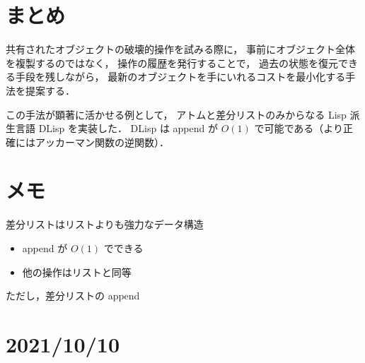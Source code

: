 \documentclass[10pt, a4j, twocolumn]{scrartcl}
\begin{document}
\section{まとめ}
\label{sec:orgd113ce0}

共有されたオブジェクトの破壊的操作を試みる際に，
事前にオブジェクト全体を複製するのではなく，
操作の履歴を発行することで，
過去の状態を復元できる手段を残しながら，
最新のオブジェクトを手にいれるコストを最小化する手法を提案する．

この手法が顕著に活かせる例として，
アトムと差分リストのみからなる Lisp 派生言語 DLisp を実装した．
DLisp は append が \(O(1)\) で可能である（より正確にはアッカーマン関数の逆関数）．




\section{メモ}
\label{sec:orgf8c03f4}

差分リストはリストよりも強力なデータ構造
\begin{itemize}
\item append が \(O(1)\) でできる
\item 他の操作はリストと同等
\end{itemize}


ただし，差分リストの append


\section{2021/10/10}
\label{sec:org0401582}
\end{document}
